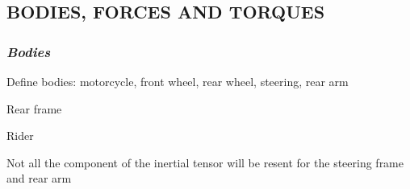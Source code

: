 \documentclass{article}
\begin{document}
\subsection{\textbf{BODIES, FORCES AND TORQUES}}
\subsubsection{\textbf{\textit{Bodies}}}
\begin{maplegroup}
\begin{Maple Normal}{
Define bodies: motorcycle, front wheel, rear wheel, steering, rear arm}\end{Maple Normal}

\end{maplegroup}
\begin{maplegroup}
\begin{Maple Normal}{
Rear frame}\end{Maple Normal}

\end{maplegroup}
\begin{maplegroup}
\begin{mapleinput}
\end{mapleinput}
\end{maplegroup}
\begin{maplegroup}
\begin{Maple Normal}{
Rider}\end{Maple Normal}

\end{maplegroup}
\begin{maplegroup}
\begin{mapleinput}
\end{mapleinput}
\end{maplegroup}
\begin{maplegroup}
\begin{Maple Normal}{
Not all the component of the inertial tensor will be resent for the steering frame and rear arm}\end{Maple Normal}

\end{maplegroup}
\begin{maplegroup}
\begin{mapleinput}
\end{mapleinput}
\end{maplegroup}
\end{document}
